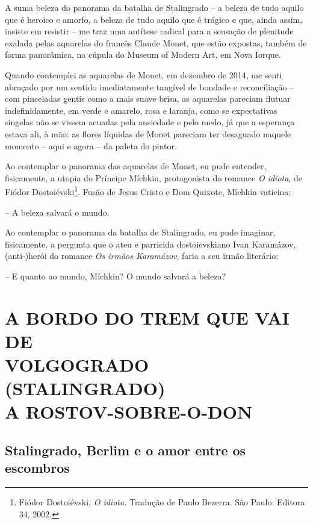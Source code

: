 A suma beleza do panorama da batalha de Stalingrado -- a beleza de tudo
aquilo que é heroico e amorfo, a beleza de tudo aquilo que é trágico e
que, ainda assim, insiste em resistir -- me traz uma antítese radical
para a sensação de plenitude exalada pelas aquarelas do francês Claude
Monet, que estão expostas, também de forma panorâmica, na cúpula do
Museum of Modern Art, em Nova Iorque.

Quando contemplei as aquarelas de Monet, em dezembro de 2014, me senti
abraçado por um sentido imediatamente tangível de bondade e
reconciliação -- com pinceladas gentis como a mais suave brisa, as
aquarelas pareciam flutuar indefinidamente, em verde e amarelo, rosa e
laranja, como se expectativas singelas não se vissem acuadas pela
ansiedade e pelo medo, já que a esperança estava ali, à mão: as flores
líquidas de Monet pareciam ter desaguado naquele momento -- aqui e agora
-- da paleta do pintor.

Ao contemplar o panorama das aquarelas de Monet, eu pude entender,
fisicamente, a utopia do Príncipe Míchkin, protagonista do romance
\emph{O idiota}, de Fiódor Dostoiévski\footnote{Fiódor Dostoiévski,
  \emph{O idiota.} Tradução de Paulo Bezerra. São Paulo: Editora 34,
  2002.}. Fusão de Jesus Cristo e Dom Quixote, Míchkin vaticina:

-- A beleza salvará o mundo.

Ao contemplar o panorama da batalha de Stalingrado, eu pude imaginar,
fisicamente, a pergunta que o ateu e parricida dostoievskiano Ivan
Karamázov, (anti-)herói do romance \emph{Os irmãos Karamázov}, faria a
seu irmão literário:

-- E quanto ao mundo, Míchkin? O mundo salvará a beleza?

\clearpage{\pagestyle{empty}\cleardoublepage}
\movetooddpage
{}
\part*{A BORDO DO TREM QUE VAI DE\\VOLGOGRADO (STALINGRADO)\\A ROSTOV-SOBRE-O-DON}

\chapter*{Stalingrado, Berlim e o amor entre os escombros}

